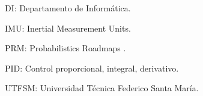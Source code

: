 
{\setlength{\parskip}{0cm} %
DI: Departamento de Informática.

IMU: Inertial Measurement Units.

PRM: Probabilistics Roadmaps .

PID: Control proporcional, integral, derivativo.

UTFSM: Universidad Técnica Federico Santa María.
}
